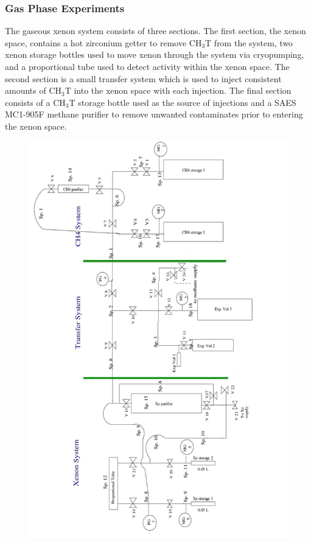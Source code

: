 \documentclass[a4paper,12pt]{article}
\begin{document}
{\subsubsection{Gas Phase Experiments}

The gaseous xenon system consists of three sections. The first section, the
xenon space, contains a hot zirconium getter to remove CH$_3$T from the system, two xenon storage bottles used to move xenon through the system via cryopumping, and a proportional tube used to detect activity within the xenon space. The second section is a small transfer system which is used to inject consistent amounts of CH$_3$T into the xenon space with each injection. The final section consists of a CH$_3$T storage bottle used as the source of injections and a SAES MC1-905F methane purifier to remove unwanted contaminates prior to entering the xenon space.

\begin{figure}
\includegraphics[scale=.55]{GasSystem.png} 
\label{UMDGasSystem}
\end{figure}

}
\end{document}

